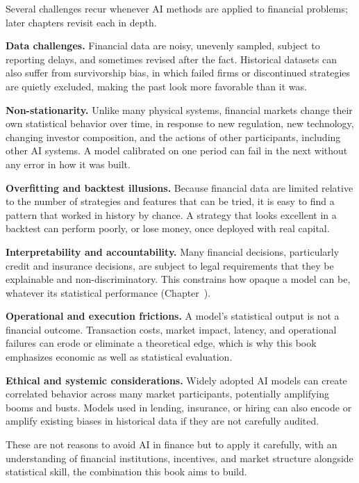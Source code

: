 \documentclass[../ai_in_finance]{subfiles}
\begin{document}
Several challenges recur whenever AI methods are applied to financial problems; later chapters revisit each in depth.

\textbf{Data challenges.} Financial data are noisy, unevenly sampled, subject to reporting delays, and sometimes revised after the fact. Historical datasets can also suffer from survivorship bias, in which failed firms or discontinued strategies are quietly excluded, making the past look more favorable than it was.

\textbf{Non-stationarity.} Unlike many physical systems, financial markets change their own statistical behavior over time, in response to new regulation, new technology, changing investor composition, and the actions of other participants, including other AI systems. A model calibrated on one period can fail in the next without any error in how it was built.

\textbf{Overfitting and backtest illusions.} Because financial data are limited relative to the number of strategies and features that can be tried, it is easy to find a pattern that worked in history by chance. A strategy that looks excellent in a backtest can perform poorly, or lose money, once deployed with real capital.

\textbf{Interpretability and accountability.} Many financial decisions, particularly credit and insurance decisions, are subject to legal requirements that they be explainable and non-discriminatory. This constrains how opaque a model can be, whatever its statistical performance (Chapter~).

\textbf{Operational and execution frictions.} A model's statistical output is not a financial outcome. Transaction costs, market impact, latency, and operational failures can erode or eliminate a theoretical edge, which is why this book emphasizes economic as well as statistical evaluation.

\textbf{Ethical and systemic considerations.} Widely adopted AI models can create correlated behavior across many market participants, potentially amplifying booms and busts. Models used in lending, insurance, or hiring can also encode or amplify existing biases in historical data if they are not carefully audited.

These are not reasons to avoid AI in finance but to apply it carefully, with an understanding of financial institutions, incentives, and market structure alongside statistical skill, the combination this book aims to build.
\end{document}
